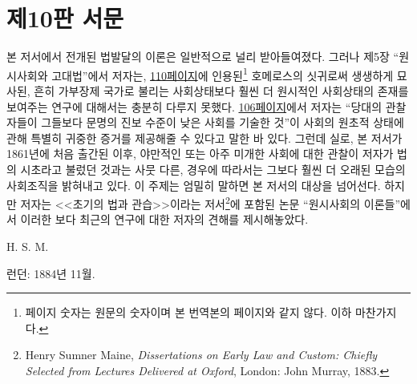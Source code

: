 \chapter*{제10판 서문}

본 저서에서 전개된 법발달의 이론은 일반적으로 널리 받아들여졌다.
그러나
제5장 ``원시사회와 고대법''에서
저자는,
\hyperlink{cyclops}{110페이지}에 인용된\footnote{%
  페이지 숫자는 원문의 숫자이며 본 번역본의 페이지와 같지 않다.
  이하 마찬가지다.
}
호메로스의 싯귀로써 생생하게 묘사된,
흔히 가부장제 국가로 불리는
사회상태보다
훨씬 더 원시적인 사회상태의 존재를 보여주는 연구에 대해서는
충분히 다루지 못했다.
\hyperlink{contemporary}{106페이지}에서 저자는
``당대의 관찰자들이 그들보다 문명의 진보 수준이 낮은 사회를 기술한 것''이
사회의 원초적 상태에 관해 특별히 귀중한 증거를 제공해줄 수 있다고
말한 바 있다.
그런데 실로,
본 저서가 1861년에 처음 출간된 이후,
야만적인 또는 아주 미개한 사회에 대한 관찰이
저자가 법의 시초라고 불렀던 것과는 사뭇 다른,
경우에 따라서는 그보다 훨씬 더 오래된
모습의 사회조직을 밝혀내고 있다.
이 주제는 엄밀히 말하면 본 저서의 대상을 넘어선다.
하지만
저자는
<<초기의 법과 관습>>이라는
저서\footnote{%
  \latinmarks
  Henry Sumner Maine,
  \textit{Dissertations on Early Law and Custom:
  Chiefly Selected from Lectures Delivered at Oxford},
  London: John Murray, 1883.
}에
포함된 논문
``원시사회의 이론들''에서
이러한 보다 최근의 연구에 대한 저자의 견해를 제시해놓았다.

\begin{flushright}
H. S. M.
\end{flushright}

\begin{footnotesize}
런던: 1884년 11월.
\end{footnotesize}

